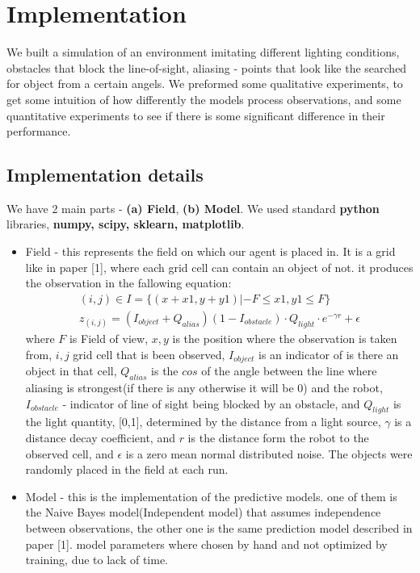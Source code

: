 \documentclass{article}
\begin{document}
	\section{Implementation}
	
	We built a simulation of an environment imitating different lighting conditions, obstacles that block the line-of-sight, aliasing - points that look like the searched for object from a certain angels.
	We preformed some qualitative experiments, to get some intuition of how differently the models process observations, and some quantitative experiments to see if there is some significant difference in their performance.
	
	\subsection{Implementation details}
	We have 2 main parts - \textbf{(a) Field}, \textbf{(b) Model}.
	We used standard \textbf{python} libraries, \textbf{numpy, scipy, sklearn, matplotlib}.     
	\begin{itemize}
		\item Field - this represents the field on which our agent is placed in. It is a grid like in paper [1], where each grid cell can contain an object of not. it produces the observation in the fallowing equation:
		\begin{align*}
		(i,j)\in I = \{(x+x1,y+y1)|-F \leq x1,y1 \leq F\} \\
		z_{(i,j)} = (I_{object} + Q_{alias})(1 - I_{obstacle}) \cdot Q_{light} \cdot e^{- \gamma r} + \epsilon 
		\end{align*}
		where $F$ is Field of view, $x,y$ is the position where the observation is taken from, $i,j$ grid cell that is been observed, $I_{object}$ is an indicator of is there an object in that cell,
		$Q_{alias}$ is the $cos$ of the angle between the line where aliasing is strongest(if there is any otherwise it will be 0) and the robot, $I_{obstacle}$ - indicator of line of sight being blocked by an obstacle, and $Q_{light}$ is the light quantity, [0,1], determined by the distance from a light source,
		$\gamma$ is a distance decay coefficient, and $r$ is the distance form the robot to the observed cell,
		and $\epsilon$ is a zero mean normal distributed noise.
		The objects were randomly placed in the field at each run.
		
		\item Model - this is the implementation of the predictive models. one of them is the Naive Bayes model(Independent model) that assumes independence between observations, the other one is the same prediction model described in paper [1]. model parameters where chosen by hand and not optimized by training, due to lack of time. 
	\end{itemize}
\end{document}
